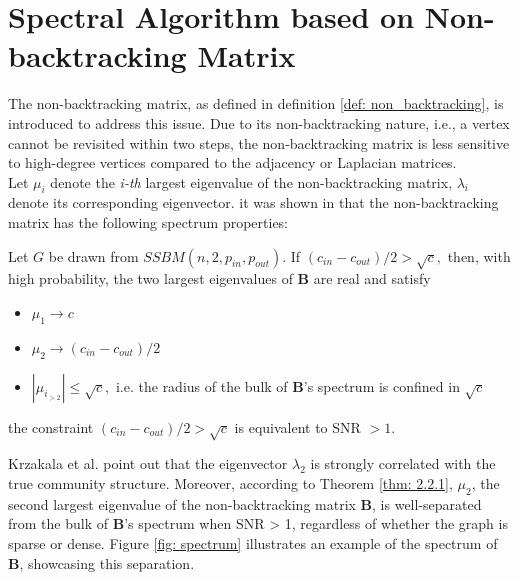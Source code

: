 \section{Spectral Algorithm based on Non-backtracking Matrix}\label{sec: Spectral Algorithm based on Non-backtracking Matrix}
The non-backtracking matrix, as defined in definition \ref{def: non_backtracking}, is introduced to address this issue. Due to its non-backtracking nature, i.e., a vertex cannot be revisited within two steps, the non-backtracking matrix is less sensitive to high-degree vertices compared to the adjacency or Laplacian matrices.\\
Let $\mu_i$ denote the \textit{i-th} largest eigenvalue of the non-backtracking matrix, $\lambda_i$ denote its corresponding eigenvector.
it was shown in \cite{the_non-backtracking} that the non-backtracking matrix has the following spectrum properties:
\begin{theorem}\label{thm: 2.2.1}
    Let $G$ be drawn from $SSBM(n, 2, p_{in}, p_{out}).$ If $(c_{in}-c_{out})/2>\sqrt{c},$ then, with high probability, the two largest eigenvalues of $\mathbf{B}$ are real and satisfy
    \begin{itemize}
     \vspace{-5mm}
        \item $\mu_1\to c$
        \vspace{-3mm}
        \item $\mu_2\to(c_{in}-c_{out})/2$
        \vspace{-3mm}
        \item $|\mu_{i_{>2}}|\leq\sqrt{c},$ i.e. the radius of the bulk of $\mathbf{B}$'s spectrum is confined in $\sqrt{c}$
    \end{itemize}
\end{theorem}
\begin{remark}
    the constraint $(c_{in}-c_{out})/2>\sqrt{c}$ is equivalent to SNR $>1.$
\end{remark}
Krzakala et al. \cite{the_non-backtracking} point out that the eigenvector $\lambda_2$ is strongly correlated with the true community structure. Moreover, according to Theorem \ref{thm: 2.2.1}, $\mu_2$, the second largest eigenvalue of the non-backtracking matrix $\mathbf{B}$, is well-separated from the bulk of $\mathbf{B}$'s spectrum when SNR > 1, regardless of whether the graph is sparse or dense. Figure \ref{fig: spectrum} illustrates an example of the spectrum of $\mathbf{B}$, showcasing this separation.
